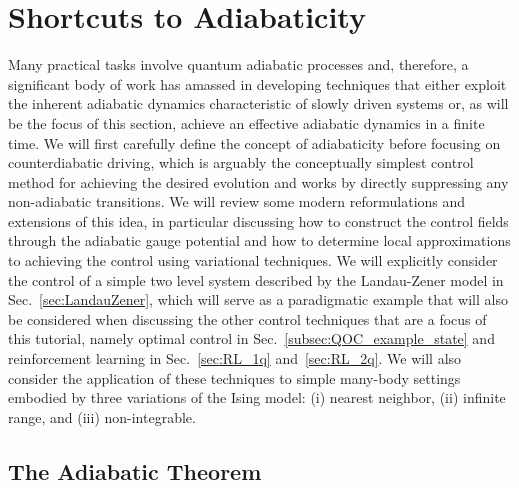 \section{Shortcuts to Adiabaticity}
\label{sec:STA}

Many practical tasks involve quantum adiabatic processes and, therefore, a significant body of work has amassed in developing techniques that either exploit the inherent adiabatic dynamics characteristic of slowly driven systems or, as will be the focus of this section, achieve an effective adiabatic dynamics in a finite time. We will first carefully define the concept of adiabaticity before focusing on counterdiabatic driving, which is arguably the conceptually simplest control method for achieving the desired evolution and works by directly suppressing any non-adiabatic transitions. We will review some modern reformulations and extensions of this idea, in particular discussing how to construct the control fields through the adiabatic gauge potential and how to determine local approximations to achieving the control using variational techniques. We will explicitly consider the control of a simple two level system described by the Landau-Zener model in Sec.~\ref{sec:LandauZener}, which will serve as a paradigmatic example that will also be considered when discussing the other control techniques that are a focus of this tutorial, namely optimal control in Sec.~\ref{subsec:QOC_example_state} and reinforcement learning in Sec.~\ref{sec:RL_1q} and~\ref{sec:RL_2q}. We will also consider the application of these techniques to simple many-body settings embodied by three variations of the Ising model: (i) nearest neighbor, (ii) infinite range, and (iii) non-integrable.
\vskip1cm


\subsection{The Adiabatic Theorem}

